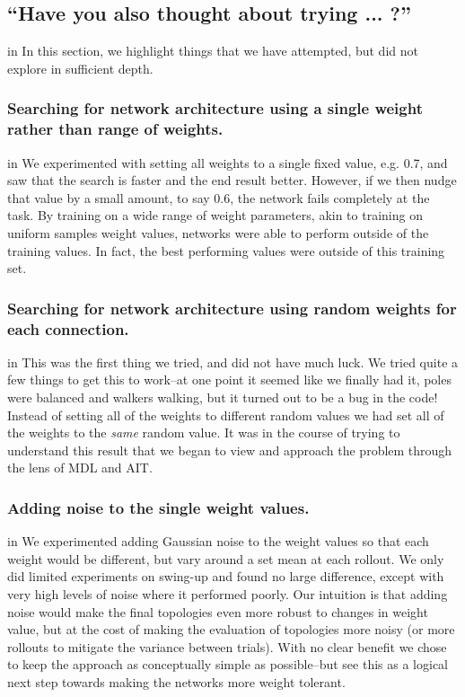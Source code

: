 \subsection{“Have you also thought about trying ... ?”}
 in
In this section, we highlight things that we have attempted, but did not explore in sufficient depth.

\subsubsection{Searching for network architecture using a single weight rather than range of weights.}
 in
We experimented with setting all weights to a single fixed value, e.g. 0.7, and saw that the search is faster and the end result better. However, if we then nudge that value by a small amount, to say 0.6, the network fails completely at the task. By training on a wide range of weight parameters, akin to training on uniform samples weight values, networks were able to perform outside of the training values. In fact, the best performing values were outside of this training set.


\subsubsection{Searching for network architecture using random weights for each connection.}
 in
This was the first thing we tried, and did not have much luck. We tried quite a few things to get this to work--at one point it seemed like we finally had it, poles were balanced and walkers walking, but it turned out to be a bug in the code! Instead of setting all of the weights to different random values we had set all of the weights to the \textit{same} random value. It was in the course of trying to understand this result that we began to view and approach the problem through the lens of MDL and AIT.

\subsubsection{Adding noise to the single weight values.}
 in
We experimented adding Gaussian noise to the weight values so that each weight would be different, but vary around a set mean at each rollout. We only did limited experiments on swing-up and found no large difference, except with very high levels of noise where it performed poorly. Our intuition is that adding noise would make the final topologies even more robust to changes in weight value, but at the cost of making the evaluation of topologies more noisy (or more rollouts to mitigate the variance between trials). With no clear benefit we chose to keep the approach as conceptually simple as possible--but see this as a logical next step towards making the networks more weight tolerant.


